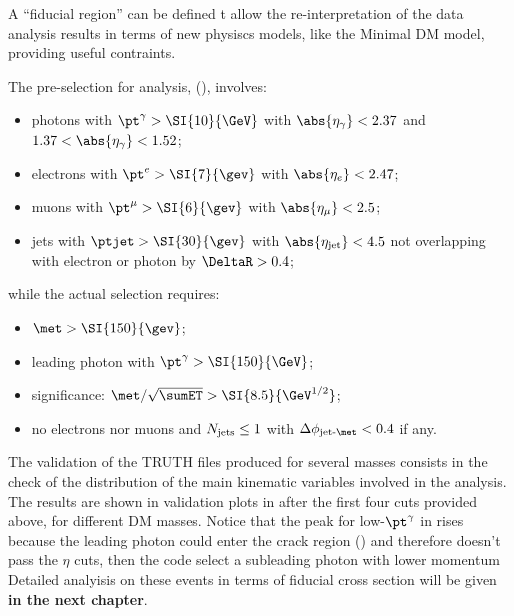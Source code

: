 A ``fiducial region'' can be defined t allow the re-interpretation of the data analysis results in terms of new physiscs models, like the Minimal DM model, providing useful contraints.
 
The pre-selection for \mph analysis, (\Sect{\ref{sec:SRselection}}), involves:
\begin{itemize}
\item photons with $\pt^\gamma>\SI{10}{\GeV}$ with $\abs{\eta_\gamma}<2.37$ and $1.37<\abs{\eta_\gamma}<1.52$;
\item electrons with $\pt^e>\SI{7}{\gev}$ with $\abs{\eta_e}<2.47$;
\item muons with $\pt^\mu>\SI{6}{\gev}$ with $\abs{\eta_\mu}<2.5$;
\item jets with $\ptjet>\SI{30}{\gev}$ with $\abs{\eta_{\textup{jet}}}<4.5$ not overlapping with electron or photon by $\DeltaR > 0.4$;
\end{itemize}
while the actual selection requires:
\begin{itemize}
\item $\met>\SI{150}{\gev}$;
\item leading photon with $\pt^\gamma > \SI{150}{\GeV}$;
\item \met significance: $\met/\sqrt{\sumET} > \SI{8.5}{\GeV^{1/2}}$;
\item no electrons nor muons and $N_\textup{jets}\le 1$ with $\Delta\phi_\textup{jet-\met}<0.4$ if any.
\end{itemize}

The validation of the TRUTH files produced for several \chizero masses consists in the check of the distribution of the main kinematic variables involved in the analysis. The results are shown in validation plots in \Fig{\ref{fig:validation}} after the first four cuts provided above, for different DM masses. Notice that the peak for low-$\pt^\gamma$ in \Fig{\ref{subfig:phpt}} rises because the leading photon could enter the crack region () and therefore doesn't pass the $\eta$ cuts, then the code select a subleading photon with lower momentum
Detailed analyisis on these events in terms of fiducial cross section will be given {\bfseries in the next chapter}.

